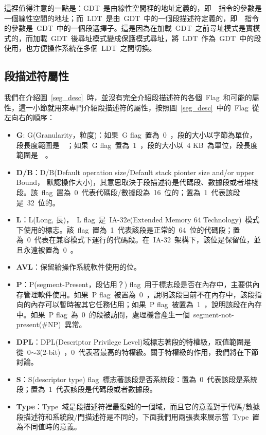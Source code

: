 這裡值得注意的一點是：GDT~是由線性空間裡的地址定義的，即~~指令的參數是一個線性空間的地址；而~LDT~是由~GDT~中的一個段描述符定義的，即~~指令的參數是~GDT~中的一個段選擇子。這是因為在加載~GDT~之前尋址模式是實模式的，而加載~GDT~後尋址模式變成保護模式尋址，將~LDT~作為~GDT~中的段使用，也方便操作系統在多個~LDT~之間切換。

\subsection{段描述符屬性} \label{CHpm_desattr}

我們在介紹圖~\ref{seg_desc}~時，並沒有完全介紹段描述符的各個~Flag~和可能的屬性，這一小節就用來專門介紹段描述符的屬性，按照圖~\ref{seg_desc}~中的~Flag~從左向右的順序：

\begin{itemize}
\item{\textbf{G}}: G(Granularity，粒度)：如果~G flag~置為~0~，段的大小以字節為單位，段長度範圍是~~；如果~G flag~置為~1~，段的大小以~4 KB~為單位，段長度範圍是~~。
\item{\textbf{D/B}}：D/B(Default operation size/Default stack pionter size and/or upper Bound， 默認操作大小)，其意思取決于段描述符是代碼段、數據段或者堆棧段。該~flag~置為~0~代表代碼段/數據段為~16~位的；置為~1~代表該段是~32~位的。
\item{\textbf{L}}：L(Long, 長)，~L flag~是~IA-32e(Extended Memory 64 Technology)~模式下使用的標志。該~flag~置為~1~代表該段是正常的~64~位的代碼段；置為~0~代表在兼容模式下運行的代碼段。在~IA-32~架構下，該位是保留位，並且永遠被置為~0~。
\item{\textbf{AVL}}：保留給操作系統軟件使用的位。
\item{\textbf{P}}：P(segment-Present，段佔用？) flag~用于標志段是否在內存中，主要供內存管理軟件使用。如果~P flag~被置為~0~，說明該段目前不在內存中，該段指向的內存可以暫時被其它任務佔用；如果~P flag~被置為~1~，說明該段在內存中。如果~P flag~為~0~的段被訪問，處理機會產生一個~segment-not-present(\#NP)~異常。
\item{\textbf{DPL}}：DPL(Descriptor Privilege Level)域標志著段的特權級，取值範圍是從~0$\sim$3(2-bit)~，0~代表著最高的特權級。關于特權級的作用，我們將在下節討論。
\item{\textbf{S}}：S(descriptor type) flag~標志著該段是否系統段：置為~0~代表該段是系統段；置為~1~代表該段是代碼段或者數據段。
\item{\textbf{Type}}：Type~域是段描述符裡最復雜的一個域，而且它的意義對于代碼/數據段描述符和系統段/門描述符是不同的，下面我們用兩張表來展示當~Type~置為不同值時的意義。


\end{itemize}
